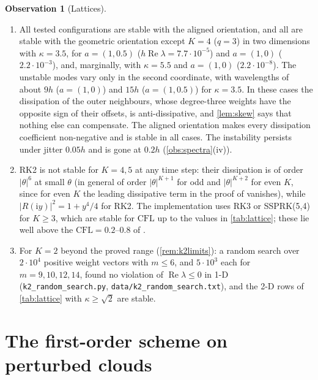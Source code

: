 \documentclass[11pt,a4paper]{article}
\theoremstyle{plain}
\theoremstyle{definition}
\newtheorem{observation}[theorem]{Observation}
\theoremstyle{remark}
\numberwithin{equation}{section}
\newcommand{\CFL}{\mathrm{CFL}}
\renewcommand{\Re}{\operatorname{Re}}
\newcommand{\A}[1]{\cite[#1]{Addendum}}
\begin{document}
\begin{observation}[Lattices]\label{obs:lattice}
\begin{enumerate}[label=(\roman*)]
\item All tested configurations are stable with the aligned orientation, and all are stable with the geometric orientation except $K=4$ ($q=3$) in two dimensions with $\kappa=3.5$, for $a=(1,0.5)$ ($h\Re\lambda=7.7\cdot10^{-5}$) and $a=(1,0)$ ($2.2\cdot10^{-3}$), and, marginally, with $\kappa=5.5$ and $a=(1,0)$ ($2.2\cdot10^{-8}$). The unstable modes vary only in the second coordinate, with wavelengths of about $9h$ ($a=(1,0)$) and $15h$ ($a=(1,0.5)$) for $\kappa=3.5$. In these cases the dissipation of the outer neighbours, whose degree-three weights have the opposite sign of their offsets, is anti-dissipative, and \cref{lem:skew} says that nothing else can compensate. The aligned orientation makes every dissipation coefficient non-negative and is stable in all cases. The instability persists under jitter $0.05h$ and is gone at $0.2h$ (\cref{obs:spectra}(iv)).
\item RK2 is not stable for $K=4,5$ at any time step: their dissipation is of order $|\theta|^6$ at small $\theta$ (in general of order $|\theta|^{K+1}$ for odd and $|\theta|^{K+2}$ for even $K$, since for even $K$ the leading dissipative term in the proof of \A{Prop.~4.3} vanishes), while $|R(\mathrm{i}y)|^2=1+y^4/4$ for RK2. The implementation uses RK3 or SSPRK(5,4) for $K\ge3$, which are stable for $\CFL$ up to the values in \cref{tab:lattice}; these lie well above the $\CFL=0.2$--$0.8$ of \cite{JungMUSCL2026}.
\item For $K=2$ beyond the proved range (\cref{rem:k2limits}): a random search over $2\cdot10^4$ positive weight vectors with $m\le6$, and $5\cdot10^3$ each for $m=9,10,12,14$, found no violation of $\Re\lambda\le0$ in 1-D (\texttt{k2\_random\_search.py}, \texttt{data/k2\_random\_search.txt}), and the 2-D rows of \cref{tab:lattice} with $\kappa\ge\sqrt2$ are stable.
\end{enumerate}
\end{observation}

\section{The first-order scheme on perturbed clouds}\label{sec:numfirst}
\end{document}
